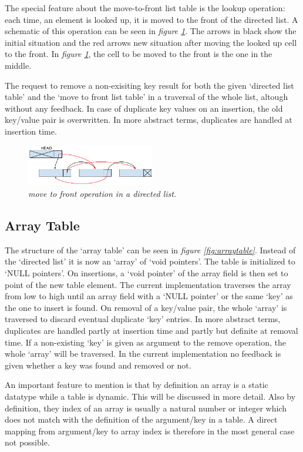 \documentclass[a4paper,11pt,twoside]{article}
\begin{document}
The special feature about the move-to-front list table is the lookup
operation: each time, an element is looked up, it is moved to the
front of the directed list. A schematic of this operation can be seen
in \textit{figure \ref{fig:movetofront}}. The arrows in black show the
initial situation and the red arrows new situation after moving the
looked up cell to the front. In \textit{figure \ref{fig:movetofront}},
the cell to be moved to the front is the one in the middle.

The request to remove a non-exisiting key result for both the given
`directed list table' and the `move to front list table' in a traversal 
of the whole list, altough without any feedback. In case of duplicate
key values on an insertion, the old key/value pair is overwritten. In
more abstract terms, duplicates are handled at insertion time. 

\begin{figure}[H]
\centering
\includegraphics[width=0.5\textwidth]{figures/movetofront.pdf}
\caption{\textit{move to front operation in a directed list.}}
\label{fig:movetofront}
\end{figure}

\subsection{Array Table}
The structure of the `array table' can be seen in \textit{figure
  \ref{fig:arraytable}}. Instead of the `directed list' it is now
an `array' of `void pointers'. The table is initialized to `NULL
pointers'. On insertions, a `void pointer' of the array field is then
set to point of the new table element. The current implementation
traverses the array from low to high until an array field with a `NULL
pointer' or the same `key' as the one to insert is found. On removal
of a key/value pair, the whole `array' is traversed to discard eventual
duplicate `key' entries. In more abstract terms, duplicates are handled
partly at insertion time and partly but definite at removal time. 
If a non-existing `key' is given as argument to
the remove operation, the whole `array' will be traversed. In the
current implementation no feedback is given whether a key was found
and removed or not.   

An important feature to mention is that by definition an array is a 
static datatype while a table is dynamic. This will be discussed in 
more detail. Also by definition, they index of an array is usually a 
natural number or integer which does not match with the definition of 
the argument/key in a table. A direct mapping from argument/key to 
array index is therefore in the most general case not possible. 
\end{document}

